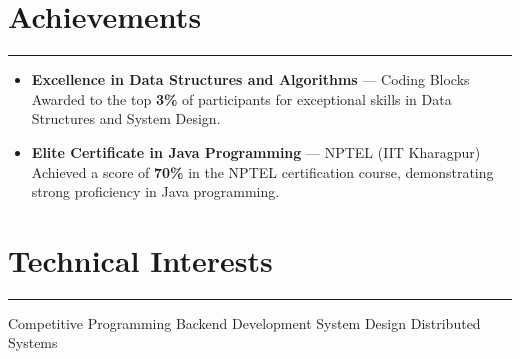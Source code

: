 \documentclass[]{resume-openfont}
\begin{document}
\section{Achievements}
\vspace{0mm}
\hrule
\vspace{3mm}
\begin{itemize}\itemsep-2pt

  \item \textbf{Excellence in Data Structures and Algorithms} --- Coding Blocks \\
  Awarded to the top \textbf{3\%} of participants for exceptional skills in Data Structures and System Design.
  
  \item \textbf{Elite Certificate in Java Programming} --- NPTEL (IIT Kharagpur) \\
  Achieved a score of \textbf{70\%} in the NPTEL certification course, demonstrating strong proficiency in Java programming.
\end{itemize}
\sectionsep

\section{Technical Interests}
\vspace{0mm}
\hrule
\vspace{3mm}
\textbullet{}Competitive Programming \textbullet{}Backend Development \textbullet{} System Design \textbullet{} Distributed Systems 
\end{document}
